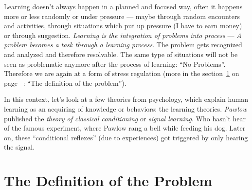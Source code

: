 \documentclass[../main.tex]{subfiles}
\begin{document}
Learning doesn't always happen in a planned and focused way, often it happens more or less {randomly or under pressure} --- maybe through random encounters and activities, through situations which put up pressure (I have to earn money) or through suggestion.
\emph{Learning is the integration of problems into process} ---  \emph{A problem becomes a task through a learning process}. The problem gets recognized and analyzed and therefore resolvable. The same type of situations will not be seen as problematic anymore after the process of learning: ``No Problems''. Therefore we are again at a form of stress regulation (more in the section~\ref{Le:problem} on page ~\pageref{Le:problem}: ``The definition of the problem'').


In this context, let's look at a few theories from psychology, which explain human learning as an acquiring of knowledge or behaviors: the learning theories.
\emph{Pawlow} published the \emph{theory of classical conditioning} or \emph{signal learning}.
Who hasn't hear of the famous experiment, where Pawlow rang a bell while feeding his dog. Later on, these ``conditional reflexes'' (due to experiences) got triggered by only hearing the signal.


\section{The Definition of the Problem}\label{Le:problem}
\end{document}

